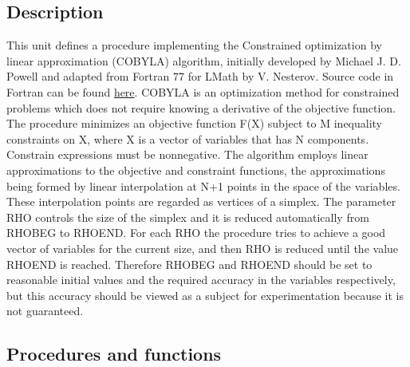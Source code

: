 \documentclass[12pt,a4paper,oneside]{report}
\begin{document}
\subsection{Description}
This unit defines a procedure implementing the Constrained optimization by linear approximation (COBYLA) algorithm, initially developed by Michael J. D. Powell and adapted from Fortran 77 for LMath by V. Nesterov. Source code in Fortran can be found \href{http://mat.uc.pt/~zhang/software.html#cobyla}{here}.  COBYLA is an optimization method for constrained problems which does not require knowing a derivative of the objective function. The procedure minimizes an objective function F(X) subject to M inequality constraints on X, where X is a vector of variables that has N components. Constrain expressions must be nonnegative. The algorithm employs linear approximations to the objective and constraint functions, the approximations being formed by linear interpolation at N+1 points in the space of the variables.
These interpolation points are regarded as vertices of a simplex. The parameter RHO controls the size of the simplex and it is reduced automatically from RHOBEG to RHOEND. For each RHO the procedure tries to achieve a good vector of variables for the current size, and then RHO is reduced until the value RHOEND is reached. Therefore RHOBEG and RHOEND should be set to reasonable initial values and the required accuracy in the variables respectively, but this accuracy should be viewed as a subject for experimentation because it is not guaranteed.
\subsection{Procedures and functions}
\end{document}
